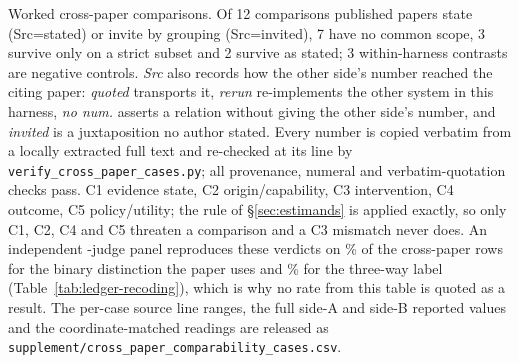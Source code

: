 \begin{table}[t]
\caption{Worked cross-paper comparisons. Of 12 comparisons published papers state (Src=stated) or invite by grouping (Src=invited), 7 have no common scope, 3 survive only on a strict subset and 2 survive as stated; 3 within-harness contrasts are negative controls. \emph{Src} also records how the other side's number reached the citing paper: \emph{quoted} transports it, \emph{rerun} re-implements the other system in this harness, \emph{no num.} asserts a relation without giving the other side's number, and \emph{invited} is a juxtaposition no author stated. Every number is copied verbatim from a locally extracted full text and re-checked at its line by \texttt{verify\_cross\_paper\_cases.py}; all \VerifChecks{} provenance, numeral and verbatim-quotation checks pass. C1 evidence state, C2 origin/capability, C3 intervention, C4 outcome, C5 policy/utility; the rule of \S\ref{sec:estimands} is applied exactly, so only C1, C2, C4 and C5 threaten a comparison and a C3 mismatch never does. An independent \RecJudges{}-judge panel reproduces these verdicts on \RecBinaryPct\% of the cross-paper rows for the binary distinction the paper uses and \RecThreeWayPct\% for the three-way label (Table~\ref{tab:ledger-recoding}), which is why no rate from this table is quoted as a result. The per-case source line ranges, the full side-A and side-B reported values and the coordinate-matched readings are released as \texttt{supplement/cross\_paper\_comparability\_cases.csv}.}
\label{tab:cross-paper-cases}
\end{table}
